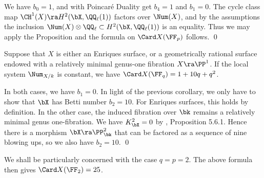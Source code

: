 \proof
We have $b_0=1$, and with Poincar\'e Duality get $b_4=1$ and $b_1=0$. The cycle class map $\CH^1(X)\ra H^2(\bX,\QQ_\ell(1))$
factors over $\Num(X)$, and  by the assumptions  the inclusion $\Num(X)\otimes\QQ_\ell\subset H^2(\bX,\QQ_\ell(1))$ is an equality.
Thus we may apply the  Proposition and  the formula on  $\Card X(\FF_p)$ follows.
\qed

\begin{corollary}
\notready
\label{points on enriques}
Suppose that $X$ is either an Enriques surface, or a  geometrically rational   surface endowed
with a relatively minimal genus-one fibration $X\ra\PP^1$. If the local system $\Num_{X/k}$ is constant,
we have  $\Card X(\FF_q) = 1+10q+q^2$.
\end{corollary}

\proof
In both cases, we have $b_1=0$.
In light of the previous corollary, we only have to show
that $\bX$ has Betti number $b_2=10$. For Enriques surfaces, this holds by definition.
In the other case, the induced  fibration over $\bk$ remains a relatively minimal genus one-fibration.
We have $K_{\bX}^2=0$ by \cite{Cossec-Dolgachev-1989}, Proposition 5.6.1.
Hence there is a morphism $\bX\ra\PP^2_\bk$ that can be factored as a sequence of nine blowing ups,
so we also have $b_2=10$.
\qed


We shall be particularly concerned with the case $q=p=2$. The above formula then gives $\Card X(\FF_2)=25$.


